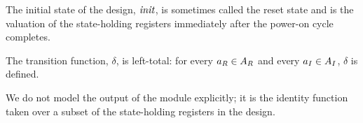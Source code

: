 The initial state of the design, $\mathit{init}$, is sometimes called the reset state and is the
valuation of the state-holding registers immediately after the power-on
cycle completes.

The transition function, $\delta$, is left-total: for every
$a_{R} \in A_{R}$ and every
$a_{I} \in A_{I}$, $\delta$ is
defined.

We do not model the output of the
module explicitly; it is the identity function taken over a subset of the
state-holding registers in the design.




